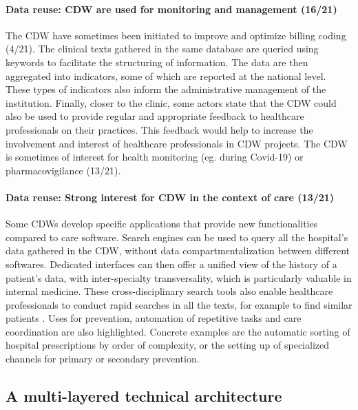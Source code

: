 \documentclass[french,12pt,twoside,a4paper]{book}
\begin{document}
\paragraph{Data reuse: CDW are used for monitoring and management (16/21)}


The CDW have sometimes been initiated to improve and optimize billing coding
(4/21). The clinical texts gathered in the same database are queried using
keywords to facilitate the structuring of information. The data are then
aggregated into indicators, some of which are reported at the national level.
These types of indicators also inform the administrative management of the
institution. Finally, closer to the clinic, some actors state that the CDW could
also be used to provide regular and appropriate feedback to healthcare
professionals on their practices. This feedback would help to increase the
involvement and interest of healthcare professionals in CDW projects. The CDW is
sometimes of interest for health monitoring (eg. during Covid-19) or
pharmacovigilance (13/21).


\paragraph{Data reuse: Strong interest for CDW in the context of care (13/21)}

Some CDWs develop specific applications that provide new functionalities
compared to care software. Search engines can be used to query all the
hospital's data gathered in the CDW, without data compartmentalization between
different softwares. Dedicated interfaces can then offer a unified view of the
history of a patient's data, with inter-specialty transversality, which is
particularly valuable in internal medicine. These cross-disciplinary search
tools also enable healthcare professionals to conduct rapid searches in all the
texts, for example to find similar patients \citep{garcelon_finding_2017}. Uses
for prevention, automation of repetitive tasks and care coordination are also
highlighted. Concrete examples are the automatic sorting of hospital
prescriptions by order of complexity, or the setting up of specialized channels
for primary or secondary prevention.
%

\subsection{A multi-layered technical architecture}%
\label{subsec:cdw:results:architecture}%
\end{document}
